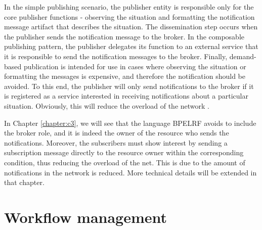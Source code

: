 In the simple publishing scenario, the publisher entity is responsible only for the core publisher
functions - observing the situation and formatting
the notification message artifact that describes
the situation. The dissemination step occurs 
when the publisher sends the notification message to the
broker. In the composable publishing pattern, the publisher
delegates its function to an external service that it is responsible to send
the notification messages to the broker. Finally,
demand-based publication is intended for use in
cases where observing the situation or formatting the messages is expensive,
and therefore the notification should be avoided. To this end, the publisher
will only send notifications to the broker if it is registered as a service
interested in receiving notifications about a particular situation. Obviously, this
will reduce the overload of the network \cite{}. 

In Chapter \ref{chapter:c3}, we will see that the language BPELRF avoids to include the broker role, and
it is indeed the owner of the resource who sends the notifications. Moreover, the subscribers
must show interest by sending a subscription message directly to the resource owner within
the corresponding condition, thus reducing the overload of the net. This is due to the amount of notifications
in the network is reduced. More technical details will be extended in that chapter.


\section{Workflow management}

